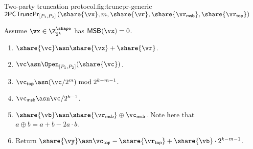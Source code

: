 \begin{Boxfig}{Two-party truncation protocol.}{fig:truncpr-generic}
  {$\mathsf{2PCTruncPr}_{[P_1, P_2]} \left( \share{\vx}, m, \share{\vr}, \share{\vr_{\mathsf{msb}}}, \share{\vr_{\mathsf{top}}} \right)$}
  
  Assume $\vx \in \Z_{2^k}^{\shape}$ has $\mathsf{MSB}(\vx) = 0$. 
  \begin{enumerate}
  
  \item $\share{\vc} \asn \share{\vx} + \share{\vr}$.
  
  \item $\vc \asn \Open_{[P_1, P_2]}(\share{\vc})$.
  
  \item $\vc_{\mathsf{top}} \asn (\vc / 2^m) \bmod 2^{k-m-1}$.
  
  \item $\vc_{\mathsf{msb}} \asn \vc / 2^{k-1}$.
    
  \item $\share{\vb} \asn \share{\vr_{\mathsf{msb}}} \oplus \vc_{\mathsf{msb}}$. Note here that $a \oplus b = a + b - 2a\cdot b$.
    
  \item Return $\share{\vy} \asn \vc_{\mathsf{top}} - \share{\vr_{\mathsf{top}}} + \share{\vb} \cdot 2^{k-m-1}$.
\end{enumerate}

\end{Boxfig}


